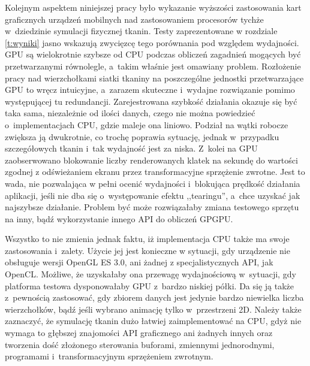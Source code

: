 	
	Kolejnym aspektem niniejszej pracy było wykazanie wyższości zastosowania kart graficznych urządzeń mobilnych nad zastosowaniem procesorów tychże w~dziedzinie symulacji fizycznej tkanin. Testy zaprezentowane w rozdziale \ref{t:wyniki} jasno wskazują zwycięzcę tego porównania pod względem wydajności. GPU są wielokrotnie szybsze od CPU podczas obliczeń zagadnień mogących być przetwarzanymi równolegle, a~takim właśnie jest omawiany problem. Rozłożenie pracy nad wierzchołkami siatki tkaniny na poszczególne jednostki przetwarzające GPU to wręcz intuicyjne, a~zarazem skuteczne i~wydajne rozwiązanie pomimo występującej tu redundancji. Zarejestrowana szybkość działania okazuje się być taka sama, niezależnie od ilości danych, czego nie można powiedzieć o~implementacjach CPU, gdzie maleje ona liniowo. Podział na wątki robocze zwiększa ją dwukrotnie, co trochę poprawia sytuację, jednak w~przypadku szczegółowych tkanin i~tak wydajność jest za niska. Z~kolei na GPU zaobserwowano blokowanie liczby renderowanych klatek na sekundę do wartości zgodnej z odświeżaniem ekranu przez transformacyjne sprzężenie zwrotne. Jest to wada, nie pozwalająca w pełni ocenić wydajności i~blokująca prędkość działania aplikacji, jeśli nie dba się o~występowanie efektu ,,tearingu'', a~chce uzyskać jak najszybsze działanie. Problem być może rozwiązałaby zmiana testowego sprzętu na inny, bądź wykorzystanie innego API do obliczeń GPGPU.
	
	Wszystko to nie zmienia jednak faktu, iż implementacja CPU także ma swoje zastosowania i~zalety. Użycie jej jest konieczne w sytuacji, gdy urządzenie nie obsługuje wersji OpenGL ES 3.0, ani żadnej z specjalistycznych API, jak OpenCL. Możliwe, że uzyskałaby ona przewagę wydajnościową w~sytuacji, gdy platforma testowa dysponowałaby GPU z~bardzo niskiej półki. Da się ją także z~pewnością zastosować, gdy zbiorem danych jest jedynie bardzo niewielka liczba wierzchołków, bądź jeśli wybrano animację tylko w~przestrzeni 2D. Należy także zaznaczyć, że symulację tkanin dużo łatwiej zaimplementować na CPU, gdyż nie wymaga to głębszej znajomości API graficznego ani żadnych innych oraz tworzenia dość złożonego sterowania buforami, zmiennymi jednorodnymi, programami i~transformacyjnym sprzężeniem zwrotnym.
	

